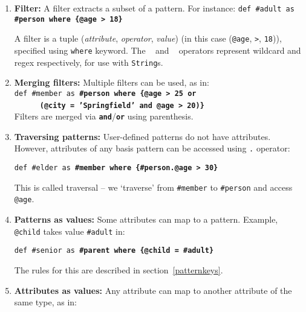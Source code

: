 \begin{enumerate}
	\item \textbf{Filter:} A filter extracts a subset of a pattern. For instance: 	
\colorbox{Light}{\small \texttt{def \#adult as \bfseries{\#person where \{@age > 18\}}}}

A filter is a tuple ({\em attribute}, {\em operator}, {\em value}) (in this case (\texttt{@age}, \texttt{>}, \texttt{18})), specified using \texttt{where} keyword. %
The \tld~ and \tld\tld~ operators represent wildcard and regex respectively, for use with \texttt{String}s.

	\item \textbf{Merging filters:} Multiple filters can be used, as in:\\
\texttt{\colorbox{Light}{\small def \#member as \bfseries{\#person where \{@age > 25 or }}} \\
\phantom{.}~~~~~~\texttt{\small \colorbox{Light}{\bfseries{(@city = 'Springfield' and @age > 20)\}}}}\\
	Filters are merged via \texttt{\bf and}/\texttt{\bf or} using parenthesis. 
	
	\item \textbf{Traversing patterns:} User-defined patterns do not have attributes. However, attributes of any basis pattern can be accessed using  \texttt{.} operator:
	
	\texttt{\small \colorbox{Light}{def \#elder as \bfseries{\#member where \{\#person.@age > 30\}}}}
	
	This is called traversal --  we `traverse' from \texttt{\#member} to \texttt{\#person} and access \texttt{@age}. %
	
	
	\item \label{patterkeyexample}\label{pattern_as_value}\textbf{Patterns as values:} Some attributes can map to a pattern. Example, \texttt{@child} takes value \texttt{\#adult} in:
	
	\texttt{\small \colorbox{Light}{def \#senior as \bfseries{\#parent where \{@child = \#adult\}}}}
	
	The rules for this are described in section~\ref{patternkeys}.
	
	\item \label{end}\label{attribute_as_value}\textbf{Attributes as values:} Any attribute	can map to another attribute of the same type, as in: 
	

\end{enumerate}

